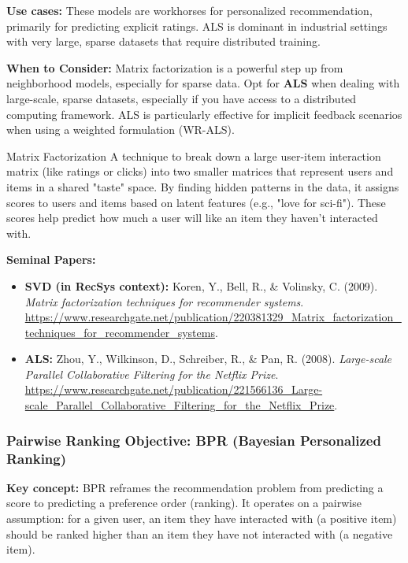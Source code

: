 \documentclass{article}
\begin{document}
\noindent\textbf{Use cases:} These models are workhorses for personalized recommendation, primarily for predicting explicit ratings. ALS is dominant in industrial settings with very large, sparse datasets that require distributed training.

\noindent\textbf{When to Consider:} Matrix factorization is a powerful step up from neighborhood models, especially for sparse data. Opt for \textbf{ALS} when dealing with large-scale, sparse datasets, especially if you have access to a distributed computing framework. ALS is particularly effective for implicit feedback scenarios when using a weighted formulation (WR-ALS).

    \begin{asidebox}{Matrix Factorization}
    A technique to break down a large user-item interaction matrix (like ratings or clicks) into two smaller matrices that represent users and items in a shared "taste" space. By finding hidden patterns in the data, it assigns scores to users and items based on latent features (e.g., "love for sci-fi"). These scores help predict how much a user will like an item they haven’t interacted with.
    \end{asidebox}

\noindent\textbf{Seminal Papers:}
    \begin{itemize}
        \item \textbf{SVD (in RecSys context):} Koren, Y., Bell, R., \& Volinsky, C. (2009). \textit{Matrix factorization techniques for recommender systems}. \url{https://www.researchgate.net/publication/220381329_Matrix_factorization_techniques_for_recommender_systems}.
        \item \textbf{ALS:} Zhou, Y., Wilkinson, D., Schreiber, R., \& Pan, R. (2008). \textit{Large-scale Parallel Collaborative Filtering for the Netflix Prize}. \url{https://www.researchgate.net/publication/221566136_Large-scale_Parallel_Collaborative_Filtering_for_the_Netflix_Prize}.
    \end{itemize}

    \subsubsection{Pairwise Ranking Objective: BPR (Bayesian Personalized Ranking)}
\noindent\textbf{Key concept:} BPR reframes the recommendation problem from predicting a score to predicting a preference order (ranking). It operates on a pairwise assumption: for a given user, an item they have interacted with (a positive item) should be ranked higher than an item they have not interacted with (a negative item).
\end{document}
